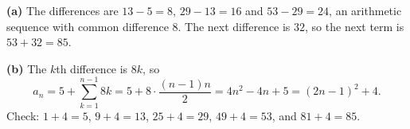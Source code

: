 \textbf{(a)} The differences are $13-5=8$, $29-13=16$ and $53-29=24$, an arithmetic sequence with common difference $8$. The next difference is $32$, so the next term is $53+32=\boxed{85}$.

\textbf{(b)} The $k$th difference is $8k$, so
\[a_n=5+\sum_{k=1}^{n-1}8k=5+8\cdot\dfrac{(n-1)n}{2}=4n^2-4n+5=\boxed{(2n-1)^2+4}.\]
Check: $1+4=5$, $9+4=13$, $25+4=29$, $49+4=53$, and $81+4=85$.
